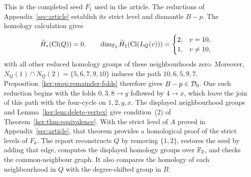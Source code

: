 \begin{table}[htbp]
\centering
\caption{The complete adjacency data of the completed seed \(A\).}
\label{ker:tab:seed}\label{tab:seed-adjacency}

\end{table}

This is the completed seed $F_1$ used in the article. The reductions of
Appendix~\ref{sec:article} establish its strict level and dismantle $B-p$.
The homology calculation gives
\[
 \widetilde H_*(\operatorname{Cl}(Q))=0,\qquad
 \dim_{\mathbb F_2}\widetilde H_1(\operatorname{Cl}(L_Q(v)))=
 \begin{cases}2,&v=10,\\1,&v\ne10,\end{cases}
\]
with all other reduced homology groups of these neighbourhoods zero.
Moreover, $N_Q(1)\cap N_Q(2)=\{5,6,7,9,10\}$ induces the path
$10,6,5,9,7$. Proposition~\ref{ker:prop:remainder-folds} therefore gives
$B-p\in\mathcal D_0$. One such reduction begins with the folds $0,3,8\to y$ followed by $4\to x$, which
leave the join of this path with the four-cycle on $1,2,y,x$.
The displayed neighbourhood groups and Lemma~\ref{ker:lem:delete-vertex}
give condition~(2) of Theorem~\ref{ker:thm:equivalence}.
With the strict level of $A$ proved in Appendix~\ref{sec:article}, that
theorem provides a homological proof of the strict levels of $F_k$.
The report reconstructs $Q$ by removing $\{1,2\}$, restores the seed by adding
that edge, computes the displayed homology groups over $\mathbb F_2$, and checks the
common-neighbour graph. It also compares the homology of each neighbourhood
in $Q$ with the degree-shifted group in $B$.
